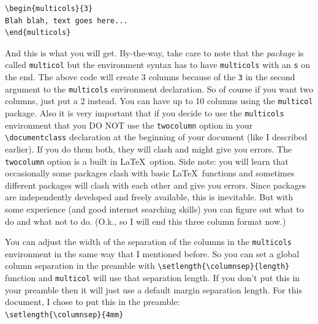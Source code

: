 \documentclass{article}
\newcommand{\nid}{\noindent} %
\begin{document}
\begin{verbatim}
\begin{multicols}{3}
Blah blah, text goes here...
\end{multicols}
\end{verbatim}
\begin{multicols}{3}
\nid And this is what you will get.  By-the-way, take care to note that the \emph{package} is called \texttt{multicol} but the environment syntax has to have \texttt{multicols} with an \texttt{s} on the end.  The above code will create 3 columns because of the \verb|3| in the second argument to the \verb|multicols| environment declaration.  So of course if you want two columns, just put a 2 instead.  You can have up to 10 columns using the \texttt{multicol} package.  Also it is very important that if you decide to use the \verb|multicols| environment that you DO NOT use the \verb|twocolumn| option in your \verb|\documentclass| declaration at the beginning of your document (like I described earlier).  If you do them both, they will clash and might give you errors.  The \verb|twocolumn| option is a built in \LaTeX\ option.  Side note: you will learn that occasionally some packages clash with basic \LaTeX\ functions and sometimes different packages will clash with each other and give you errors.  Since packages are independently developed and freely available, this is inevitable.  But with some experience (and good internet searching skills) you can figure out what to do and what not to do. (O.k., so I will end this three column format now.)
\end{multicols}

You can adjust the width of the separation of the columns in the \verb|multicols| environment in the same way that I mentioned before.  So you can set a global column separation in the preamble with \verb|\setlength{\columnsep}{length}| function and \verb|multicol| will use that separation length. If you don't put this in your preamble then it will just use a default margin separation length.  For this document, I chose to put this in the preamble:\\

\nid\verb|\setlength{\columnsep}{4mm}|\\
\end{document}
